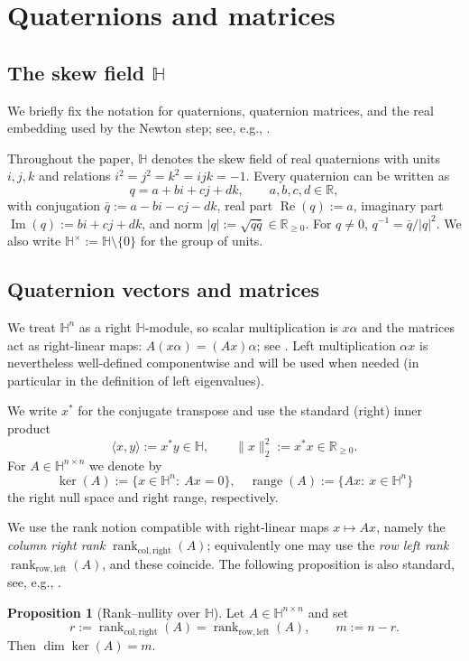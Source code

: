 \documentclass[preprint,12pt]{elsarticle}  %
\theoremstyle{definition}
\theoremstyle{definition}
\theoremstyle{definition}
\theoremstyle{definition}
\theoremstyle{definition}
\newtheorem{Pro}{Proposition}
\theoremstyle{remark}
\theoremstyle{remark}
\theoremstyle{remark}
\DeclareRobustCommand{\i}{\ensuremath{\mathbf{i}}}
\DeclareRobustCommand{\j}{\ensuremath{\mathbf{j}}}
\DeclareRobustCommand{\k}{\ensuremath{\mathbf{k}}}
\def\i{i}\def\j{j}\def\k{k}%
\renewcommand{\Re}{\operatorname{Re}}
\renewcommand{\Im}{\operatorname{Im}}
\newcommand{\RR}{\mathbb{R}}
\newcommand{\HH}{\mathbb{H}}
\DeclareMathOperator{\rank}{rank}
\DeclareMathOperator{\Range}{range}
\begin{document}
\section{Quaternions and matrices}
\label{sec_quaternions_matrices}
\subsection{The skew field \texorpdfstring{$\HH$}{H}}
\label{subsec_quaternions}
We briefly fix the notation for quaternions, quaternion matrices, and the real embedding used by the Newton step; see, e.g., \cite{Zhang1997,Rodman2014}.

Throughout the paper, $\HH$ denotes the skew field of real quaternions with units $\i,\j,\k$ and relations $\i^2=\j^2=\k^2=\i\j\k=-1$.
Every quaternion can be written as
\[
q=a+b\i+c\j+d\k,\qquad a,b,c,d\in\RR,
\]
with conjugation $\bar q:=a-b\i-c\j-d\k$, real part $\Re(q):=a$, imaginary part $\Im(q):=b\i+c\j+d\k$, and norm $|q|:=\sqrt{q\bar q}\in\RR_{\ge0}$. For $q\neq 0$, $q^{-1}=\bar q/|q|^2$. We also write $\HH^\times:=\HH\setminus\{0\}$ for the group of units.

\subsection{Quaternion vectors and matrices}
\label{subsec_quaternion_matrices}

We treat $\HH^n$ as a right $\HH$-module, so scalar multiplication is $x\alpha$ and the matrices act as right-linear maps:
$A(x\alpha)=(Ax)\alpha$; see \cite{Rodman2014,Zhang1997}.
Left multiplication $\alpha x$ is nevertheless well-defined componentwise and will be used when needed (in particular in the definition of left eigenvalues).

We write $x^\ast$ for the conjugate transpose and use the standard (right) inner product
\[
\langle x,y\rangle := x^\ast y\in\HH,
\qquad
\|x\|_2^2:=x^\ast x\in\RR_{\ge 0}.
\]
For $A\in\HH^{n\times n}$ we denote by
\[
\ker(A):=\{x\in\HH^n:\ Ax=0\},\quad
\Range(A):=\{Ax:\ x\in\HH^n\}
\]
the right null space and right range, respectively.

We use the rank notion compatible with right-linear maps $x\mapsto Ax$, namely the \emph{column right rank} $\rank_{\mathrm{col,right}}(A)$; equivalently one may use the \emph{row left rank} $\rank_{\mathrm{row,left}}(A)$, and these coincide. The following proposition is also standard, see, e.g., \cite{Zhang1997,Rodman2014}.
%
\begin{Pro}[Rank--nullity over $\HH$]
\label{pro_rank_nullity}
Let $A\in\HH^{n\times n}$ and set
\[
r:=\rank_{\mathrm{col,right}}(A)=\rank_{\mathrm{row,left}}(A),\qquad m:=n-r.
\]
Then $\dim\ker(A)=m$.
\end{Pro}
\end{document}
